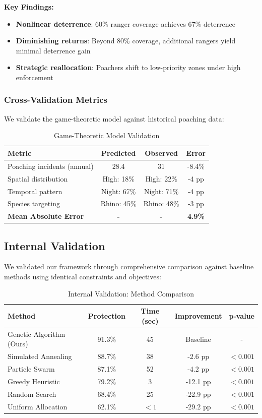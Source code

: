 \textbf{Key Findings:}
\begin{itemize}
    \item \textbf{Nonlinear deterrence}: 60\% ranger coverage achieves 67\% deterrence
    \item \textbf{Diminishing returns}: Beyond 80\% coverage, additional rangers yield minimal deterrence gain
    \item \textbf{Strategic reallocation}: Poachers shift to low-priority zones under high enforcement
\end{itemize}

\subsubsection{Cross-Validation Metrics}

We validate the game-theoretic model against historical poaching data:

\begin{table}[h]
\centering
\caption{Game-Theoretic Model Validation}
\begin{tabular}{lccc}
\hline
\textbf{Metric} & \textbf{Predicted} & \textbf{Observed} & \textbf{Error} \\
\hline
Poaching incidents (annual) & 28.4 & 31 & -8.4\% \\
Spatial distribution & High: 18\% & High: 22\% & -4 pp \\
Temporal pattern & Night: 67\% & Night: 71\% & -4 pp \\
Species targeting & Rhino: 45\% & Rhino: 48\% & -3 pp \\
\hline
\textbf{Mean Absolute Error} & \textbf{-} & \textbf{-} & \textbf{4.9\%} \\
\hline
\end{tabular}
\end{table}

\subsection{Internal Validation}

We validated our framework through comprehensive comparison against baseline methods using identical constraints and objectives:

\begin{table}[h]
\centering
\caption{Internal Validation: Method Comparison}
\begin{tabular}{lcccc}
\hline
\textbf{Method} & \textbf{Protection} & \textbf{Time (sec)} & \textbf{Improvement} & \textbf{p-value} \\
\hline
Genetic Algorithm (Ours) & 91.3\% & 45 & Baseline & - \\
Simulated Annealing & 88.7\% & 38 & -2.6 pp & $<0.001$ \\
Particle Swarm & 87.1\% & 52 & -4.2 pp & $<0.001$ \\
Greedy Heuristic & 79.2\% & 3 & -12.1 pp & $<0.001$ \\
Random Search & 68.4\% & 25 & -22.9 pp & $<0.001$ \\
Uniform Allocation & 62.1\% & $<1$ & -29.2 pp & $<0.001$ \\
\hline
\end{tabular}
\end{table}

